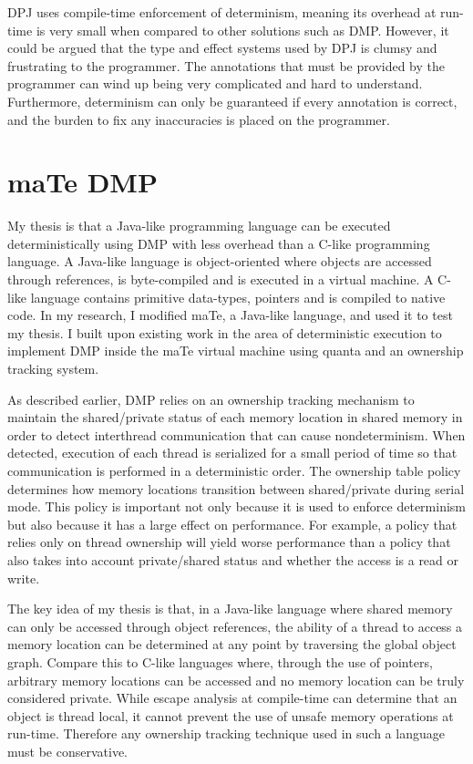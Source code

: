 DPJ uses compile-time enforcement of determinism, meaning its overhead
at run-time is very small when compared to other solutions such as
DMP.  However, it could be argued that the type and effect systems
used by DPJ is clumsy and frustrating to the programmer.  The
annotations that must be provided by the programmer can wind up being
very complicated and hard to understand.  Furthermore, determinism can
only be guaranteed if every annotation is correct, and the burden to
fix any inaccuracies is placed on the programmer.

\section{maTe DMP}

My thesis is that a Java-like programming language can be executed
deterministically using DMP with less overhead than a C-like
programming language.  A Java-like language is object-oriented where
objects are accessed through references, is byte-compiled and is
executed in a virtual machine.  A C-like language contains primitive
data-types, pointers and is compiled to native code.  In my research,
I modified maTe, a Java-like language, and used it to test my thesis.
I built upon existing work in the area of deterministic execution to
implement DMP inside the maTe virtual machine using quanta and an
ownership tracking system.

As described earlier, DMP relies on an ownership tracking mechanism to
maintain the shared/private status of each memory location in shared
memory in order to detect interthread communication that can cause
nondeterminism.  When detected, execution of each thread is serialized
for a small period of time so that communication is performed in a
deterministic order.  The ownership table policy determines how memory
locations transition between shared/private during serial mode.  This
policy is important not only because it is used to enforce determinism
but also because it has a large effect on performance.  For example, a
policy that relies only on thread ownership will yield worse
performance than a policy that also takes into account private/shared
status and whether the access is a read or write.

The key idea of my thesis is that, in a Java-like language where
shared memory can only be accessed through object references, the
ability of a thread to access a memory location can be determined at
any point by traversing the global object graph.  Compare this to
C-like languages where, through the use of pointers, arbitrary memory
locations can be accessed and no memory location can be truly
considered private.  While escape analysis at compile-time can
determine that an object is thread local, it cannot prevent the use of
unsafe memory operations at run-time.  Therefore any ownership
tracking technique used in such a language must be conservative.

